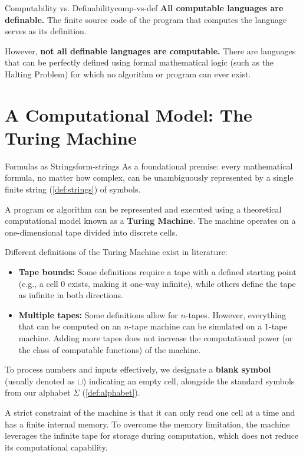 \begin{observation}{Computability vs. Definability}{comp-vs-def}
    \textbf{All computable languages are definable.} The finite source code of the program that computes the language serves as its definition. 
    
    However, \textbf{not all definable languages are computable.} There are languages that can be perfectly defined using formal mathematical logic (such as the Halting Problem) for which no algorithm or program can ever exist.
\end{observation}
\section{A Computational Model: The Turing Machine}

\begin{observation}{Formulas as Strings}{form-strings}
    As a foundational premise: every mathematical formula, no matter how complex, can be unambiguously represented by a single finite string (\cref{def:strings}) of symbols.
\end{observation}

\noindent A program or algorithm can be represented and executed using a theoretical computational model known as a \textbf{Turing Machine}. The machine operates on a one-dimensional tape divided into discrete cells. 

Different definitions of the Turing Machine exist in literature:
\begin{itemize}
    \item \textbf{Tape bounds:} Some definitions require a tape with a defined starting point (e.g., a cell \(0\) exists, making it one-way infinite), while others define the tape as infinite in both directions.
    \item \textbf{Multiple tapes:} Some definitions allow for \(n\)-tapes. However, everything that can be computed on an \(n\)-tape machine can be simulated on a \(1\)-tape machine. Adding more tapes does not increase the computational power (or the class of computable functions) of the machine.
\end{itemize}

\noindent To process numbers and inputs effectively, we designate a \textbf{blank symbol} (usually denoted as \(\sqcup\)) indicating an empty cell, alongside the standard symbols from our alphabet \(\Sigma\) (\cref{def:alphabet}). 

A strict constraint of the machine is that it can only read one cell at a time and has a finite internal memory. To overcome the memory limitation, the machine leverages the infinite tape for storage during computation, which does not reduce its computational capability.


